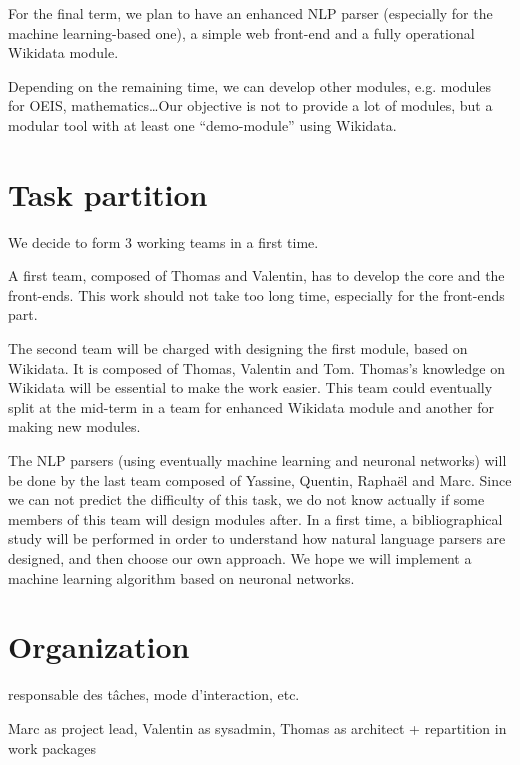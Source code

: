 \documentclass[a4paper,10pt]{article}
\begin{document}
For the final term, we plan to have an enhanced NLP parser (especially for the machine learning-based one), a simple web front-end and a fully operational Wikidata module.

Depending on the remaining time, we can develop other modules, e.g. modules for OEIS, mathematics\ldots Our objective is not to provide a lot of modules, but a modular tool with at least one ``demo-module'' using Wikidata.

\section{Task partition}

We decide to form 3 working teams in a first time.

A first team, composed of Thomas and Valentin, has to develop the core and the front-ends. This work should not take too long time, especially for the front-ends part.

The second team will be charged with designing the first module, based on Wikidata. It is composed of Thomas, Valentin and Tom. Thomas's knowledge on Wikidata will be essential to make the work easier. This team could eventually split at the mid-term in a team for enhanced Wikidata module and another for making new modules.

The NLP parsers (using eventually machine learning and neuronal networks) will be done by the last team composed of Yassine, Quentin, Raphaël and Marc. Since we can not predict the difficulty of this task, we do not know actually if some members of this team will design modules after. In a first time, a bibliographical study will be performed in order to understand how natural language parsers are designed, and then choose our own approach. We hope we will implement a machine learning algorithm based on neuronal networks. 



\section{Organization}

responsable des tâches, mode d’interaction, etc.

Marc as project lead, Valentin as sysadmin, Thomas as architect + repartition in work packages

\end{document}
